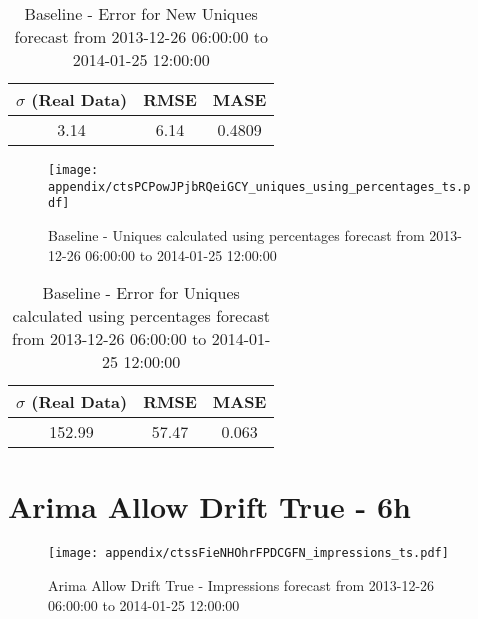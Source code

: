 \begin{table}[H]
\centering
\footnotesize
\begin{tabular}{ccc}
$\sigma$ (Real Data) & RMSE & MASE   \\ \hline
3.14 & 6.14 & 0.4809 \\
\end{tabular}

\vspace{0.5cm}

\caption[]{
Baseline - Error for New Uniques forecast from 2013-12-26 06:00:00 to 2014-01-25 12:00:00}
\end{table}

\begin{figure}[H] \begin{center} \leavevmode
\texttt{[image: appendix/ctsPCPowJPjbRQeiGCY\_uniques\_using\_percentages\_ts.pdf]} \caption[]{
Baseline - Uniques calculated using percentages forecast from 2013-12-26 06:00:00 to 2014-01-25 12:00:00} \label{fig:appendix/ctsPCPowJPjbRQeiGCY_uniques_using_percentages_ts.pdf} \end{center}
\end{figure}

\begin{table}[H]
\centering
\footnotesize
\begin{tabular}{ccc}
$\sigma$ (Real Data) & RMSE & MASE   \\ \hline
152.99 & 57.47 & 0.063 \\
\end{tabular}

\vspace{0.5cm}

\caption[]{
Baseline - Error for Uniques calculated using percentages forecast from 2013-12-26 06:00:00 to 2014-01-25 12:00:00}
\end{table}

\section{Arima Allow Drift True - 6h}
\begin{figure}[H] \begin{center} \leavevmode
\texttt{[image: appendix/ctssFieNHOhrFPDCGFN\_impressions\_ts.pdf]} \caption[]{
Arima Allow Drift True - Impressions forecast from 2013-12-26 06:00:00 to 2014-01-25 12:00:00} \label{fig:appendix/ctssFieNHOhrFPDCGFN_impressions_ts.pdf} \end{center}
\end{figure}

